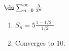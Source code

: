 {$\ds \sum_{n=0}^\infty \frac{5}{2^n}$
}
{\begin{enumerate}
\item	$S_n = 5\frac{1-1/2^n}{1/2}$
\item	Converges to 10.
\end{enumerate}
}
